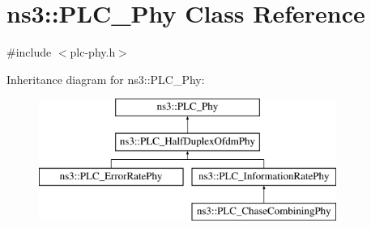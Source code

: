 \hypertarget{classns3_1_1PLC__Phy}{\section{ns3\-:\-:\-P\-L\-C\-\_\-\-Phy \-Class \-Reference}
\label{classns3_1_1PLC__Phy}
}


{\ttfamily \#include $<$plc-\/phy.\-h$>$}

\-Inheritance diagram for ns3\-:\-:\-P\-L\-C\-\_\-\-Phy\-:\begin{figure}[H]
\begin{center}
\leavevmode
\includegraphics[height=4.000000cm]{classns3_1_1PLC__Phy}
\end{center}
\end{figure}
